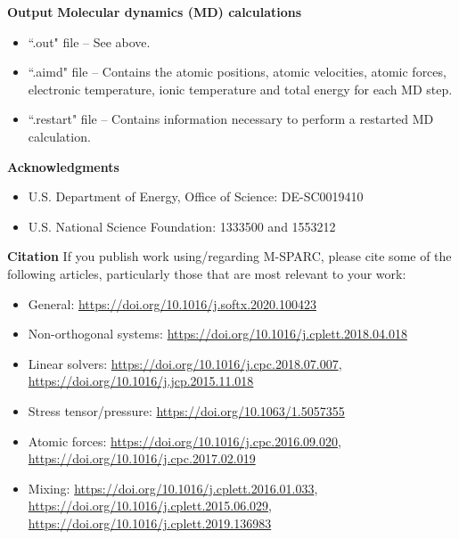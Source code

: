 \documentclass[xcolor=dvipsnames,t]{beamer}
\begin{document}
\begin{frame}{\textbf{Output}}
\textbf{Molecular dynamics (MD) calculations}  \\
\begin{itemize}
  \item ``.out" file -- See above.
  \item ``.aimd" file -- Contains the atomic positions, atomic velocities, atomic forces, electronic temperature, ionic temperature and total energy for each MD step.
  \item ``.restart" file -- Contains information necessary to perform a restarted MD calculation. 
\end{itemize}

\end{frame}




\begin{frame}[allowframebreaks]{\textbf{Acknowledgments}} \label{Acknowledgments}
\begin{itemize}
    \item U.S. Department of Energy, Office of Science: DE-SC0019410
    \item U.S. National Science Foundation: 1333500 and 1553212
\end{itemize}

\end{frame}


\begin{frame}[allowframebreaks]{\textbf{Citation}} \label{Citation}
If you publish work using/regarding M-SPARC, please cite some of the following articles, particularly those that are most relevant to your work:
\begin{itemize}
    \item General: \url{https://doi.org/10.1016/j.softx.2020.100423}
    \item Non-orthogonal systems: \url{https://doi.org/10.1016/j.cplett.2018.04.018}
    \item Linear solvers: \url{https://doi.org/10.1016/j.cpc.2018.07.007},    \url{https://doi.org/10.1016/j.jcp.2015.11.018}
    \item Stress tensor/pressure: \url{https://doi.org/10.1063/1.5057355}
    \item Atomic forces: \url{https://doi.org/10.1016/j.cpc.2016.09.020}, \url{https://doi.org/10.1016/j.cpc.2017.02.019}
    \item Mixing: \url{https://doi.org/10.1016/j.cplett.2016.01.033}, \url{https://doi.org/10.1016/j.cplett.2015.06.029}, \url{https://doi.org/10.1016/j.cplett.2019.136983}
\end{itemize}
\end{frame}
\end{document}
